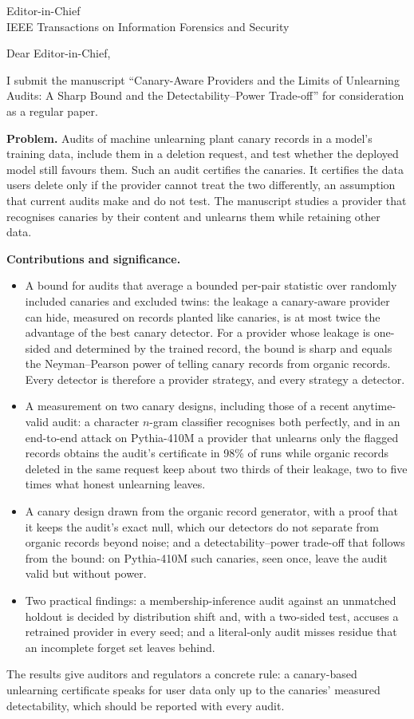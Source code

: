 \documentclass[11pt]{letter}
\begin{document}
\begin{letter}{Editor-in-Chief\\IEEE Transactions on Information Forensics and Security}
\opening{Dear Editor-in-Chief,}

I submit the manuscript ``Canary-Aware Providers and the Limits of Unlearning Audits: A Sharp
Bound and the Detectability--Power Trade-off'' for consideration as a regular paper.

\textbf{Problem.} Audits of machine unlearning plant canary records in a model's training
data, include them in a deletion request, and test whether the deployed model still favours
them. Such an audit certifies the canaries. It certifies the data users delete only if the
provider cannot treat the two differently, an assumption that current audits make and do not
test. The manuscript studies a provider that recognises canaries by their content and
unlearns them while retaining other data.

\textbf{Contributions and significance.}
\begin{itemize}
\item A bound for audits that average a bounded per-pair statistic over randomly included
canaries and excluded twins: the leakage a canary-aware provider can hide, measured on records
planted like canaries, is at most twice the advantage of the best canary detector. For a
provider whose leakage is one-sided and determined by the trained record, the bound is sharp
and equals the Neyman--Pearson power of telling canary records from organic records. Every
detector is therefore a provider strategy, and every strategy a detector.
\item A measurement on two canary designs, including those of a recent anytime-valid audit:
a character $n$-gram classifier recognises both perfectly, and in an end-to-end attack on Pythia-410M a provider that
unlearns only the flagged records obtains the audit's certificate in 98\% of runs while
organic records deleted in the same request keep about two thirds of their leakage, two to
five times what honest unlearning leaves.
\item A canary design drawn from the organic record generator, with a proof that it keeps the
audit's exact null, which our detectors do not separate from organic records beyond noise; and
a detectability--power trade-off that follows from the bound: on Pythia-410M such canaries,
seen once, leave the audit valid but without power.
\item Two practical findings: a membership-inference audit against an unmatched holdout is
decided by distribution shift and, with a two-sided test, accuses a retrained provider in every
seed; and a literal-only audit misses residue that an incomplete forget set leaves behind.
\end{itemize}
The results give auditors and regulators a concrete rule: a canary-based unlearning
certificate speaks for user data only up to the canaries' measured detectability, which
should be reported with every audit.


\end{letter}
\end{document}
